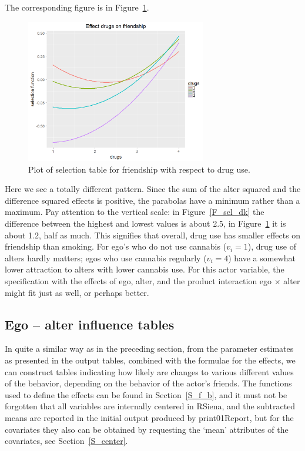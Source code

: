 \documentclass[a4paper,fleqn,11pt]{article}
\newcommand{\+}{\, + \,}
\newcommand{\rs}{{\sf RSiena}}
\begin{document}
The corresponding figure is in Figure~\ref{F_sel_dg}.

\begin{figure}[htb]
  \centering
  \includegraphics[width=0.7\textwidth]{selectionTable_drugs.png}
  \caption{Plot of selection table  for friendship with respect to drug use.}
  \label{F_sel_dg}
\end{figure}

Here we see a totally different pattern.
Since the sum of the alter squared and the difference squared effects
is positive, the parabolas have a minimum rather than a maximum.
Pay attention to the vertical scale: in Figure~\ref{F_sel_dk} the
difference between the highest and lowest values is about 2.5,
in Figure~\ref{F_sel_dg} it is about 1.2, half as much.
This signifies that overall, drug use has smaller effects on friendship
than smoking. For ego's who do not use cannabis ($v_i = 1$),
drug use of alters hardly matters;
egos who use cannabis regularly ($v_i = 4$) have a somewhat lower
attraction to alters with lower cannabis use.
For this actor variable, the specification with the effects of ego, alter,
and the product interaction ego $\times$ alter might fit just as well,
or perhaps better.

\clearpage

\subsection{Ego -- alter influence tables}

In quite a similar way as in the preceding section,
from the parameter estimates as presented in the
output tables, combined with the formulae for the effects,
we can construct tables indicating how likely are changes to
various different values of the behavior,
depending on the behavior of the actor's friends.
The functions used to define the effects can be found
in Section~\ref{S_f_b}, and it must not be forgotten that all variables
are internally centered in \rs, and the subtracted means are reported
in the initial output produced by \textsf{print01Report},
but for the covariates they also can be obtained by requesting the
`\textsf{mean}' attributes of the covariates, see Section~\ref{S_center}.
\end{document}
